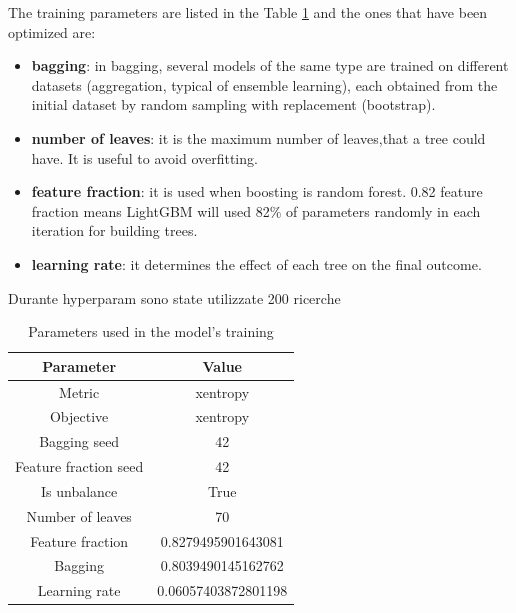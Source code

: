 			The training parameters are listed in the Table \ref{tab:parameters} and the ones that have been optimized are:
			\begin{itemize}
				\item \textbf{bagging}: in bagging, several models of the same type are trained on different datasets (aggregation, typical of ensemble learning), each obtained from the initial dataset by random sampling with replacement (bootstrap).
				\item \textbf{number of leaves}: it is the maximum number of leaves,that a tree could have. It is useful to avoid overfitting.
				\item \textbf{feature fraction}: it is used when boosting is random forest. 0.82 feature fraction means LightGBM will used 82\% of parameters randomly in each iteration for building trees.
				\item \textbf{learning rate}: it determines the effect of each tree on the final outcome.
			\end{itemize}
			Durante hyperparam sono state utilizzate 200 ricerche
			
			\begin{table}
				\centering
				\begin{tabular}{cc}
					\toprule[1.5pt]
					Parameter & Value\\
					\midrule
					Metric & xentropy \\
					Objective & xentropy \\
					Bagging seed & 42 \\
					Feature fraction seed & 42 \\
					Is unbalance & True \\
					Number of leaves & 70 \\
					Feature fraction & 0.8279495901643081 \\
					Bagging & 0.8039490145162762 \\
					Learning rate & 0.06057403872801198 \\
					\bottomrule[1.5pt]
				\end{tabular}
				\caption{Parameters used in the model's training}
				\label{tab:parameters}
			\end{table}